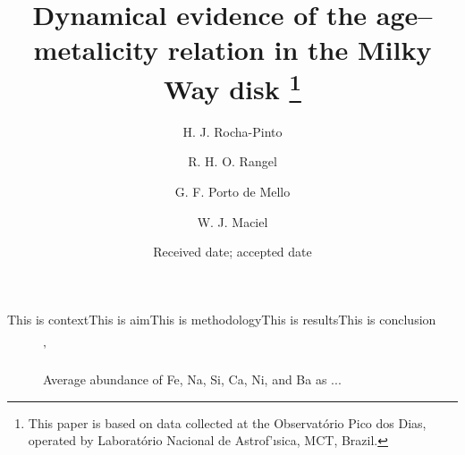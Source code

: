 \documentclass{aa}
\begin{document}
\title{Dynamical evidence of the age--metalicity relation in the Milky Way disk \thanks{This paper is based on data collected at the Observat\'orio Pico dos Dias, operated by Laborat\'orio Nacional de Astrof'{\i}sica, MCT, Brazil.}}

\author{
    H. J. Rocha-Pinto
    \and R. H. O. Rangel 
    \and G. F. Porto de Mello 
    \and W. J. Maciel 
}




\date{Received date; accepted date}

\abstract
{This is context}{This is aim}{This is methodology}{This is results}{This is conclusion}


\maketitle

\begin{figure}
    '
    \caption[]{Average abundance of Fe, Na, Si, Ca, Ni, and Ba as ...}
    \label{ztrend}
\end{figure}
\end{document}
